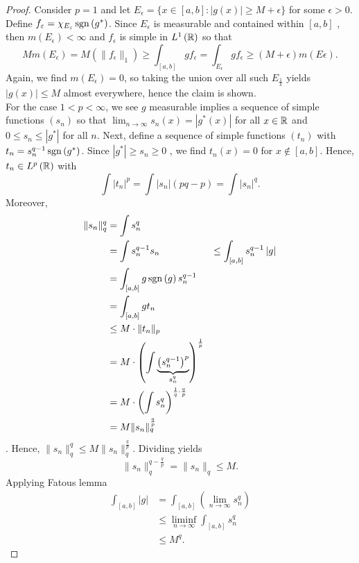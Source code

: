 \begin{proof}
	Consider \(p = 1\) and let \(E_{\epsilon}  = \{x \in \left[ a, b \right] : \left| g\left( x \right)  \right| \ge M + \epsilon\} \) for some \(\epsilon > 0\). Define \(f_{\varepsilon} = \chi_{E_{\varepsilon}} \operatorname{sgn}\left( g^{*} \right) \). Since \(E_{\epsilon}\) is measurable and contained within \(\left[ a, b \right] \) , then \(m\left( E_{\epsilon} \right) < \infty \) and \(f_{\epsilon}\) is simple in \(L^{1}\left(\mathbb{R}  \right) \) so that \[
	M m\left( E_{\epsilon} \right)  = M\left( \|f_{\epsilon}\|_{1} \right) \ge \int_{\left[ a, b \right] }g f_{\epsilon} = \int_{E_{\epsilon}} g f_{\epsilon}
	\ge \left( M + \epsilon \right) m\left( E\epsilon \right)
	.\]
	Again, we find \(m\left( E_{\epsilon} \right) = 0 \), so taking the union over all such \(E_{\frac{1}{k}}\) yields \(\left| g\left( x \right)  \right| \le M\) almost everywhere, hence the claim is shown.\\
	For the case \( 1 < p < \infty\), we see \(g\) measurable implies a sequence of simple functions \(\left( s_{n} \right) \) so that \(\lim_{n \to \infty}s_{n}\left( x \right) = \left| g^{*}\left( x \right)  \right| \) for all \(x \in \mathbb{R}\) and \(0 \le s_{n} \le \left| g^{*} \right| \) for all \(n\). Next, define a sequence of simple functions \(\left( t_{n} \right) \) with \(t_{n} = s_{n}^{q-1} \operatorname{sgn}\left( g^{*} \right) \). Since \(\left| g^{*} \right| \ge s_{n} \ge 0\) , we find \(t_{n}\left( x \right)  = 0\) for \(x \not\in \left[ a, b \right] \). Hence, \(t_{n} \in L^{p}\left( \mathbb{R} \right) \) with \[
	\int \left| t_{n} \right|^{p} = \int \left| s_{n} \right|\left( pq-p \right)   = \int \left| s_{n} \right|^{q}
	.\]
	Moreover, \begin{align*}
	\|s_{n}\|_{q}^{q} &= \int s_{n}^{q} \\
			  &= \int s_{n}^{q-1}s_{n}
			  &\le \int_{\left[ a, b \right] } s_{n}^{q-1} \left| g \right| \\
			  &= \int_{\left[ a, b \right] } g \operatorname{sgn}\left( g \right) s_{n}^{q-1} \\
			  &= \int_{\left[ a, b \right] }g t_{n} \\
			  &\le M \cdot \|t_{n}\|_{p}\\
	&= M \cdot \left( \int \underbrace{\left( s_{n}^{q-1} \right)^{p} }_{s_{n} ^{q}}   \right)^{\frac{1}{p}}  \\
	&= M\cdot \left( \int s_{n}^{q} \right)^{\frac{1}{q} \cdot \frac{q}{p}}  \\
	&=  M \|s_{n}\|_{q}^{\frac{q}{p}}
\end{align*}.
Hence, \(\|s_{n}\|_{q}^{q} \le M \|s_{n}\|_{q}^{\frac{q}{p}}\). Dividing yields \[
\|s_{n}\|_{q}^{q-\frac{q}{p}} = \|s_{n}\|_{q}\le M
.\]
Applying Fatous lemma
\begin{align*}
	\int_{\left[ a, b \right] } \left| g \right| &= \int_{\left[ a, b \right] } \left( \lim_{n \to \infty} s_{n}^{q} \right)  \\&\le  \liminf_{n \to \infty} \int_{\left[ a, b \right] } s_{n}^{q} \\
						     &\le M^{q}
.\end{align*}
\end{proof}
